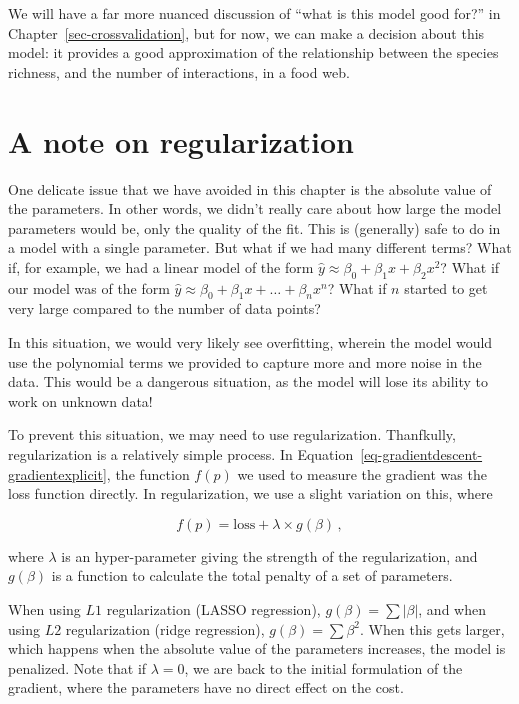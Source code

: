 \documentclass[
  letterpaper,
]{scrbook}
\begin{document}
We will have a far more nuanced discussion of ``what is this model good
for?'' in Chapter~\ref{sec-crossvalidation}, but for now, we can make a
decision about this model: it provides a good approximation of the
relationship between the species richness, and the number of
interactions, in a food web.

\section{A note on regularization}\label{a-note-on-regularization}

One delicate issue that we have avoided in this chapter is the absolute
value of the parameters. In other words, we didn't really care about how
large the model parameters would be, only the quality of the fit. This
is (generally) safe to do in a model with a single parameter. But what
if we had many different terms? What if, for example, we had a linear
model of the form \(\hat y \approx \beta_0 + \beta_1 x + \beta_2 x^2\)?
What if our model was of the form
\(\hat y \approx \beta_0 + \beta_1 x + \dots + \beta_n x^n\)? What if
\(n\) started to get very large compared to the number of data points?

In this situation, we would very likely see overfitting, wherein the
model would use the polynomial terms we provided to capture more and
more noise in the data. This would be a dangerous situation, as the
model will lose its ability to work on unknown data!

To prevent this situation, we may need to use regularization.
Thanfkully, regularization is a relatively simple process. In
Equation~\ref{eq-gradientdescent-gradientexplicit}, the function
\(f(p)\) we used to measure the gradient was the loss function directly.
In regularization, we use a slight variation on this, where

\[
f(p) = \text{loss} + \lambda \times g(\beta) \,,
\]

where \(\lambda\) is an hyper-parameter giving the strength of the
regularization, and \(g(\beta)\) is a function to calculate the total
penalty of a set of parameters.

When using \(L1\) regularization (LASSO regression),
\(g(\beta) = \sum |\beta|\), and when using \(L2\) regularization (ridge
regression), \(g(\beta) = \sum \beta^2\). When this gets larger, which
happens when the absolute value of the parameters increases, the model
is penalized. Note that if \(\lambda = 0\), we are back to the initial
formulation of the gradient, where the parameters have no direct effect
on the cost.
\end{document}
